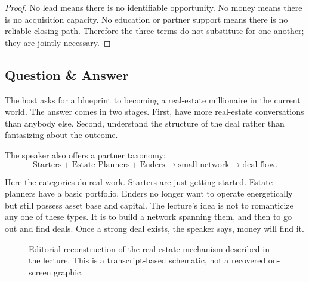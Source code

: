 \begin{proof}
No lead means there is no identifiable opportunity. No money means there is no acquisition capacity. No education or partner support means there is no reliable closing path. Therefore the three terms do not substitute for one another; they are jointly necessary.
\end{proof}

\subsection{Question \& Answer}

The host asks for a blueprint to becoming a real-estate millionaire in the current world. The answer comes in two stages. First, have more real-estate conversations than anybody else. Second, understand the structure of the deal rather than fantasizing about the outcome.

The speaker also offers a partner taxonomy:
\begin{equation}
\text{Starters}+\text{Estate Planners}+\text{Enders} \to \text{small network} \to \text{deal flow}.
\end{equation}

Here the categories do real work. Starters are just getting started. Estate planners have a basic portfolio. Enders no longer want to operate energetically but still possess asset base and capital. The lecture's idea is not to romanticize any one of these types. It is to build a network spanning them, and then to go out and find deals. Once a strong deal exists, the speaker says, money will find it.

\begin{figure}[h]
\centering
{}
\caption{Editorial reconstruction of the real-estate mechanism described in the lecture. This is a transcript-based schematic, not a recovered on-screen graphic.}
\end{figure}

